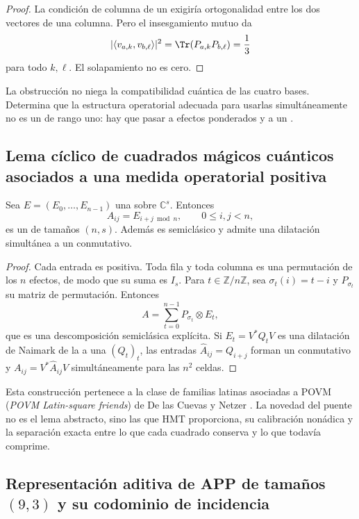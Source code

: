 \begin{proof}
La condición de columna de un \QLS exigiría ortogonalidad entre los dos
vectores de una columna. Pero el insesgamiento mutuo da
\[
 |\langle v_{a,k},v_{b,\ell}\rangle|^2
 =\Tr(P_{a,k}P_{b,\ell})=\frac13
\]
para todo $k,\ell$. El solapamiento no es cero.
\end{proof}

La obstrucción no niega la compatibilidad cuántica de las cuatro bases.
Determina que la estructura operatorial adecuada para usarlas simultáneamente no es un
\QLS de rango uno: hay que pasar a efectos ponderados y a un \QMS.

\subsection{Lema cíclico de cuadrados mágicos cuánticos asociados a una medida operatorial positiva}

\begin{lemma}
\label{p12-83-c22-s3:gmc:lem:qms-ciclico}
Sea $E=(E_0,\ldots,E_{n-1})$ una \POVM sobre $\mathbb C^s$. Entonces
\[
 A_{ij}=E_{i+j\bmod n},
 \qquad 0\le i,j<n,
 \tag{GMC-4.3}
\]
es un \QMS de tamaños $(n,s)$. Además es semiclásico y admite una
dilatación simultánea a un \QPM conmutativo.
\end{lemma}

\begin{proof}
Cada entrada es positiva. Toda fila y toda columna es una permutación de los
$n$ efectos, de modo que su suma es $I_s$. Para $t\in\mathbb Z/n\mathbb Z$,
sea $\sigma_t(i)=t-i$ y $P_{\sigma_t}$ su matriz de permutación. Entonces
\[
 A=\sum_{t=0}^{n-1}P_{\sigma_t}\otimes E_t,
 \tag{GMC-4.4}
\]
que es una descomposición semiclásica explícita. Si
$E_t=V^*Q_tV$ es una dilatación de Naimark de la \POVM a una \PVM
$(Q_t)_t$, las entradas
$\widehat A_{ij}=Q_{i+j}$ forman un \QPM conmutativo y
$A_{ij}=V^*\widehat A_{ij}V$ simultáneamente para las $n^2$ celdas.
\end{proof}

Esta construcción pertenece a la clase de familias latinas asociadas a POVM
(\emph{POVM Latin-square friends})
de De las Cuevas y Netzer \citep{delascuevas2023latin}. La novedad del puente no es el lema
abstracto, sino las \POVM que HMT proporciona, su calibración nonádica y la
separación exacta entre lo que cada cuadrado conserva y lo que todavía
comprime.

\subsection{Representación aditiva de APP de tamaños \((9,3)\) y su codominio de incidencia}

